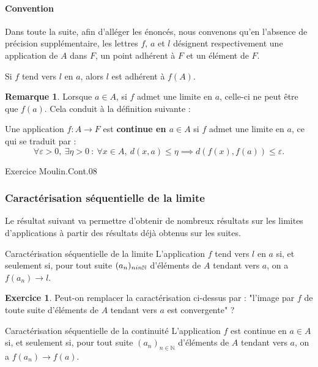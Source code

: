 \documentclass[french]{article}
\newcommand{\N}{\mathbb{N}}
\theoremstyle{plain}
\theoremstyle{definition}
\newtheorem{exo}{Exercice}
\newtheorem*{rmq}{Remarque}
\theoremstyle{remark}
\begin{document}
\paragraph{Convention} Dans toute la suite, afin d'alléger les énoncés, nous convenons qu'en l'absence de précision supplémentaire, les lettres $f$, $a$ et $l$ désignent respectivement une application de $A$ dans $F$, un point adhérent à $F$ et un élément de $F$.

\begin{thm}{}%
	Si $f$ tend vers $l$ en $a$, alors $l$ est adhérent à $f(A)$.
\end{thm}

\begin{rmq}
	Lorsque $a\in A$, si $f$ admet une limite en $a$, celle-ci ne peut être que $f(a)$. Cela conduit à la définition suivante :
\end{rmq}

\begin{dfn}
	Une application $f:A\to F$ est \textbf{continue en $a\in A$} si $f$ admet une limite en $a$, ce qui se traduit par : $$\forall\varepsilon>0,\ \exists\eta>0\ :\ \forall x\in A,\ d(x,a)\leqslant\eta\implies d(f(x),f(a))\leqslant\varepsilon.$$
\end{dfn}

Exercice Moulin.Cont.08

\subsubsection*{Caractérisation séquentielle de la limite}

Le résultat suivant va permettre d'obtenir de nombreux résultats sur les limites d'applications à partir des résultats déjà obtenus sur les suites.

\begin{thm}{Caractérisation séquentielle de la limite}%
	L'application $f$ tend vers $l$ en $a$ si, et seulement si, pour tout suite $(a_n)_{n\\in\N}$ d'éléments de $A$ tendant vers $a$, on a $f(a_n)\to l$.
\end{thm}

\begin{exo}
	Peut-on remplacer la caractérisation ci-dessus par : "l'image par $f$ de toute suite d'éléments de $A$ tendant vers $a$ est convergente" ?
\end{exo}

\begin{thm}{Caractérisation séquentielle de la continuité}%
	L'application $f$ est continue en $a\in A$ si, et seulement si, pour tout suite $(a_n)_{n\in\N}$ d'éléments de $A$ tendant vers $a$, on a $f(a_n)\to f(a)$.
\end{thm}
\end{document}
